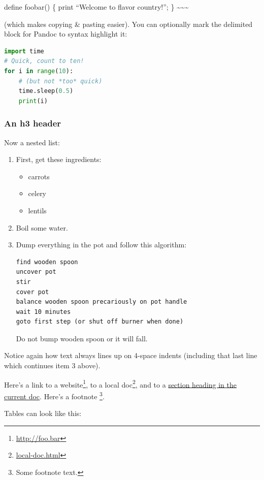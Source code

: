 \documentclass[
  12pt,
  a4paper,
  oneside,tablecaptionabove
]{scrbook}
\DeclareRobustCommand{\href}[2]{#2\footnote{\url{#1}}}
\providecommand{\tightlist}{%
  \setlength{\itemsep}{0pt}\setlength{\parskip}{0pt}}
\begin{document}
define foobar() \{ print ``Welcome to flavor country!''; \}
\textasciitilde\textasciitilde\textasciitilde{}

(which makes copying \& pasting easier). You can optionally mark the
delimited block for Pandoc to syntax highlight it:

\begin{lstlisting}[language=Python]
import time
# Quick, count to ten!
for i in range(10):
    # (but not *too* quick)
    time.sleep(0.5)
    print(i)
\end{lstlisting}

\hypertarget{an-h3-header}{%
\subsubsection{An h3 header}\label{an-h3-header}}

Now a nested list:

\begin{enumerate}
\def\labelenumi{\arabic{enumi}.}
\item
  First, get these ingredients:

  \begin{itemize}
  \tightlist
  \item
    carrots
  \item
    celery
  \item
    lentils
  \end{itemize}
\item
  Boil some water.
\item
  Dump everything in the pot and follow this algorithm:

\begin{lstlisting}
find wooden spoon
uncover pot
stir
cover pot
balance wooden spoon precariously on pot handle
wait 10 minutes
goto first step (or shut off burner when done)
\end{lstlisting}

  Do not bump wooden spoon or it will fall.
\end{enumerate}

Notice again how text always lines up on 4-space indents (including that
last line which continues item 3 above).

Here's a link to \href{http://foo.bar}{a website}, to a
\href{local-doc.html}{local doc}, and to a
\protect\hyperlink{an-h2-header}{section heading in the current doc}.
Here's a footnote \footnote{Some footnote text.}.

Tables can look like this:
\end{document}
